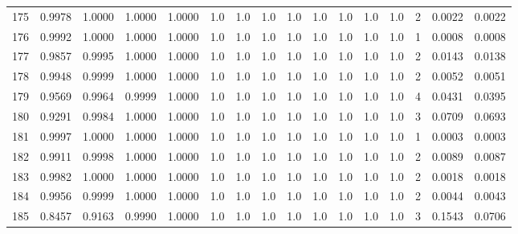 \begin{tabular}{lrrrrrrrrrrrrrrr}
175 &      0.9978 &  1.0000 &  1.0000 &  1.0000 &     1.0 &     1.0 &     1.0 &     1.0 &     1.0 &     1.0 &      1.0 &        1.0 &      2 &                    0.0022 &                     0.0022 \\
176 &      0.9992 &  1.0000 &  1.0000 &  1.0000 &     1.0 &     1.0 &     1.0 &     1.0 &     1.0 &     1.0 &      1.0 &        1.0 &      1 &                    0.0008 &                     0.0008 \\
177 &      0.9857 &  0.9995 &  1.0000 &  1.0000 &     1.0 &     1.0 &     1.0 &     1.0 &     1.0 &     1.0 &      1.0 &        1.0 &      2 &                    0.0143 &                     0.0138 \\
178 &      0.9948 &  0.9999 &  1.0000 &  1.0000 &     1.0 &     1.0 &     1.0 &     1.0 &     1.0 &     1.0 &      1.0 &        1.0 &      2 &                    0.0052 &                     0.0051 \\
179 &      0.9569 &  0.9964 &  0.9999 &  1.0000 &     1.0 &     1.0 &     1.0 &     1.0 &     1.0 &     1.0 &      1.0 &        1.0 &      4 &                    0.0431 &                     0.0395 \\
180 &      0.9291 &  0.9984 &  1.0000 &  1.0000 &     1.0 &     1.0 &     1.0 &     1.0 &     1.0 &     1.0 &      1.0 &        1.0 &      3 &                    0.0709 &                     0.0693 \\
181 &      0.9997 &  1.0000 &  1.0000 &  1.0000 &     1.0 &     1.0 &     1.0 &     1.0 &     1.0 &     1.0 &      1.0 &        1.0 &      1 &                    0.0003 &                     0.0003 \\
182 &      0.9911 &  0.9998 &  1.0000 &  1.0000 &     1.0 &     1.0 &     1.0 &     1.0 &     1.0 &     1.0 &      1.0 &        1.0 &      2 &                    0.0089 &                     0.0087 \\
183 &      0.9982 &  1.0000 &  1.0000 &  1.0000 &     1.0 &     1.0 &     1.0 &     1.0 &     1.0 &     1.0 &      1.0 &        1.0 &      2 &                    0.0018 &                     0.0018 \\
184 &      0.9956 &  0.9999 &  1.0000 &  1.0000 &     1.0 &     1.0 &     1.0 &     1.0 &     1.0 &     1.0 &      1.0 &        1.0 &      2 &                    0.0044 &                     0.0043 \\
185 &      0.8457 &  0.9163 &  0.9990 &  1.0000 &     1.0 &     1.0 &     1.0 &     1.0 &     1.0 &     1.0 &      1.0 &        1.0 &      3 &                    0.1543 &                     0.0706 \\

\end{tabular}
